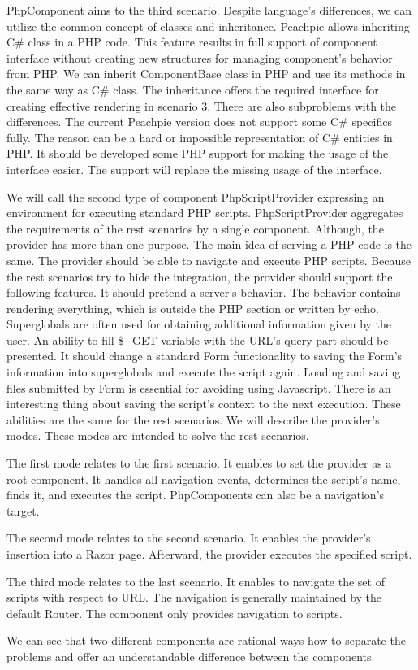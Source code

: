 PhpComponent aims to the third scenario.
Despite language's differences, we can utilize the common concept of classes and inheritance.
Peachpie allows inheriting C\# class in a PHP code.
This feature results in full support of component interface without creating new structures for managing component's behavior from PHP.
We can inherit ComponentBase class in PHP and use its methods in the same way as C\# class.
The inheritance offers the required interface for creating effective rendering in scenario 3.
There are also subproblems with the differences.
The current Peachpie version does not support some C\# specifics fully.
The reason can be a hard or impossible representation of C\# entities in PHP.
It should be developed some PHP support for making the usage of the interface easier.
The support will replace the missing usage of the interface.
\par
We will call the second type of component PhpScriptProvider expressing an environment for executing standard PHP scripts.
PhpScriptProvider aggregates the requirements of the rest scenarios by a single component.
Although, the provider has more than one purpose.
The main idea of serving a PHP code is the same.
The provider should be able to navigate and execute PHP scripts.
Because the rest scenarios try to hide the integration, the provider should support the following features.
It should pretend a server's behavior.
The behavior contains rendering everything, which is outside the PHP section or written by echo.
Superglobals are often used for obtaining additional information given by the user.
An ability to fill \$\_GET variable with the URL's query part should be presented.
It should change a standard Form functionality to saving the Form's information into superglobals and execute the script again.
Loading and saving files submitted by Form is essential for avoiding using Javascript.
There is an interesting thing about saving the script's context to the next execution.
These abilities are the same for the rest scenarios.
We will describe the provider's modes.
These modes are intended to solve the rest scenarios. 
\par
The first mode relates to the first scenario.
It enables to set the provider as a root component.
It handles all navigation events, determines the script's name, finds it, and executes the script.
PhpComponents can also be a navigation's target.
\par
The second mode relates to the second scenario.
It enables the provider's insertion into a Razor page.
Afterward, the provider executes the specified script.
\par
The third mode relates to the last scenario.
It enables to navigate the set of scripts with respect to URL.
The navigation is generally maintained by the default Router.
The component only provides navigation to scripts.
\par
We can see that two different components are rational ways how to separate the problems and offer an understandable difference between the components.


